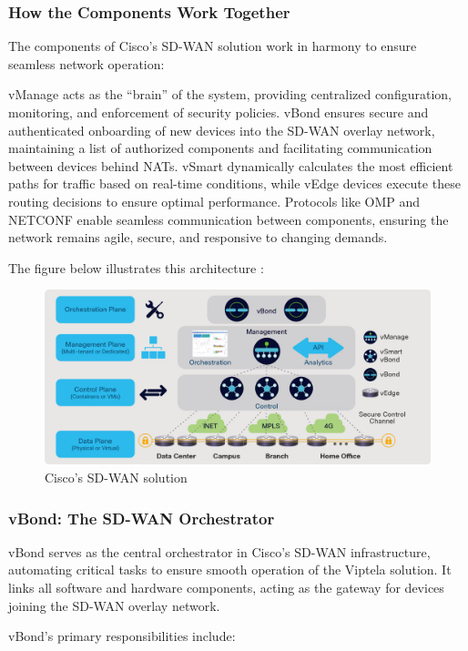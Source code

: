 \documentclass[12pt,english]{report}
\begin{document}
\subsubsection{How the Components Work Together}
The components of Cisco’s SD-WAN solution work in harmony to ensure seamless network operation:

vManage acts as the “brain” of the system, providing centralized configuration, monitoring, and enforcement of security policies.
vBond ensures secure and authenticated onboarding of new devices into the SD-WAN overlay network, maintaining a list of authorized components and facilitating communication between devices behind NATs.
vSmart dynamically calculates the most efficient paths for traffic based on real-time conditions, while vEdge devices execute these routing decisions to ensure optimal performance.
Protocols like OMP and NETCONF enable seamless communication between components, ensuring the network remains agile, secure, and responsive to changing demands\cite{ref4}.

The figure below illustrates this architecture :
\begin{figure}[H]
    \centering
    \includegraphics[width= 1\textwidth]{chapter1/sdwan cisco.png}
    \caption{Cisco’s SD-WAN solution\cite{ref15}}
    \label{fig: Cisco’s SD-WAN solution}
\end{figure}

\subsubsection{vBond: The SD-WAN Orchestrator}
vBond serves as the central orchestrator in Cisco’s SD-WAN infrastructure, automating critical tasks to ensure smooth operation of the Viptela solution. It links all software and hardware components, acting as the gateway for devices joining the SD-WAN overlay network.

vBond’s primary responsibilities include:
\end{document}
